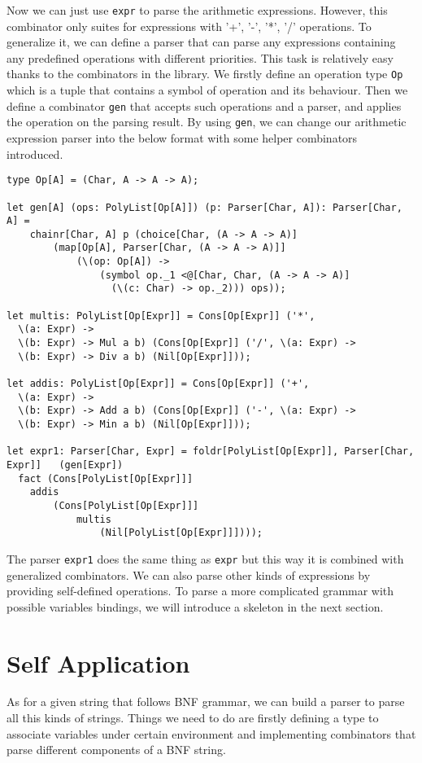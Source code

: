 Now we can just use \texttt{expr} to parse the arithmetic expressions. However, this combinator only suites for expressions with '+', '-', '*', '/' operations. To generalize it, we can define a parser that can parse any expressions containing any predefined operations with different priorities. This task is relatively easy thanks to the combinators in the library. We firstly define an operation type \texttt{Op} which is a tuple that contains a symbol of operation and its behaviour. Then we define a combinator \texttt{gen} that accepts such operations and a parser, and applies the operation on the parsing result. By using \texttt{gen}, we can change our arithmetic expression parser into the below format with some helper combinators introduced.
\begin{lstlisting}
type Op[A] = (Char, A -> A -> A);

let gen[A] (ops: PolyList[Op[A]]) (p: Parser[Char, A]): Parser[Char, A] =
    chainr[Char, A] p (choice[Char, (A -> A -> A)] 
        (map[Op[A], Parser[Char, (A -> A -> A)]] 
            (\(op: Op[A]) -> 
                (symbol op._1 <@[Char, Char, (A -> A -> A)] 
                  (\(c: Char) -> op._2))) ops));
                  
let multis: PolyList[Op[Expr]] = Cons[Op[Expr]] ('*', 
  \(a: Expr) -> 
  \(b: Expr) -> Mul a b) (Cons[Op[Expr]] ('/', \(a: Expr) -> 
  \(b: Expr) -> Div a b) (Nil[Op[Expr]]));

let addis: PolyList[Op[Expr]] = Cons[Op[Expr]] ('+', 
  \(a: Expr) -> 
  \(b: Expr) -> Add a b) (Cons[Op[Expr]] ('-', \(a: Expr) -> 
  \(b: Expr) -> Min a b) (Nil[Op[Expr]]));

let expr1: Parser[Char, Expr] = foldr[PolyList[Op[Expr]], Parser[Char, Expr]]   (gen[Expr]) 
  fact (Cons[PolyList[Op[Expr]]] 
    addis 
        (Cons[PolyList[Op[Expr]]] 
            multis 
                (Nil[PolyList[Op[Expr]]])));
\end{lstlisting}
The parser \texttt{expr1} does the same thing as \texttt{expr} but this way it is combined with generalized combinators. We can also parse other kinds of expressions by providing self-defined operations. To parse a more complicated grammar with possible variables bindings, we will introduce a skeleton in the next section.

\section{Self Application}
As for a given string that follows BNF grammar, we can build a parser to parse all this kinds of strings. Things we need to do are firstly defining a type to associate variables under certain environment and implementing combinators that parse different components of a BNF string.

